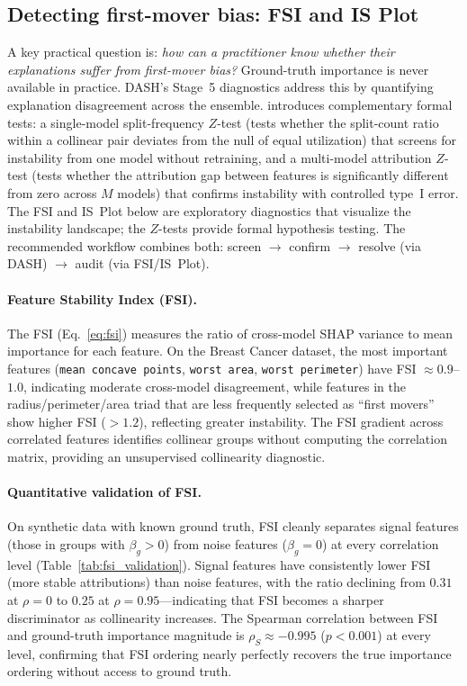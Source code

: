 \documentclass[10pt]{article}
\newcommand{\dash}{\textsc{DASH}}
\newcommand{\rhovar}{\rho}
\begin{document}
\subsection{Detecting first-mover bias: FSI and IS Plot}
\label{sec:diagnostics}

A key practical question is: \emph{how can a practitioner know whether
their explanations suffer from first-mover bias?} Ground-truth importance
is never available in practice. \dash{}'s Stage~5 diagnostics address this
by quantifying explanation disagreement across the ensemble.
\citet{caraker2026impossibility} introduces
complementary formal tests: a single-model split-frequency $Z$-test
(tests whether the split-count ratio within a collinear pair
deviates from the null of equal utilization) that screens for
instability from one model without retraining, and a multi-model
attribution $Z$-test (tests whether the attribution gap between
features is significantly different from zero across $M$ models) that
confirms instability with controlled type~I error.  The FSI and IS~Plot below are exploratory
diagnostics that visualize the instability landscape; the $Z$-tests
provide formal hypothesis testing.  The recommended workflow
combines both: screen $\to$ confirm $\to$ resolve (via \dash{})
$\to$ audit (via FSI/IS~Plot).

\paragraph{Feature Stability Index (FSI).}
The FSI (Eq.~\ref{eq:fsi}) measures the ratio of cross-model SHAP
variance to mean importance for each feature. On the Breast Cancer
dataset, the most important features (\texttt{mean concave points},
\texttt{worst area}, \texttt{worst perimeter}) have FSI $\approx 0.9$--$1.0$,
indicating moderate cross-model disagreement, while features in the
radius/perimeter/area triad that are less frequently selected as
``first movers'' show higher FSI ($> 1.2$), reflecting greater
instability. The FSI gradient across correlated features
identifies collinear groups without computing the correlation matrix,
providing an unsupervised collinearity diagnostic.

\paragraph{Quantitative validation of FSI.}
On synthetic data with known ground truth, FSI cleanly separates signal
features (those in groups with $\beta_g > 0$) from noise features
($\beta_g = 0$) at every correlation level (Table~\ref{tab:fsi_validation}).
Signal features have consistently lower FSI (more stable attributions)
than noise features, with the ratio declining from $0.31$ at $\rhovar = 0$
to $0.25$ at $\rhovar = 0.95$---indicating that FSI becomes a sharper
discriminator as collinearity increases. The Spearman correlation between
FSI and ground-truth importance magnitude is $\rhovar_S \approx -0.995$
($p < 0.001$) at every level, confirming that FSI ordering nearly
perfectly recovers the true importance ordering without access to ground
truth.
\end{document}
